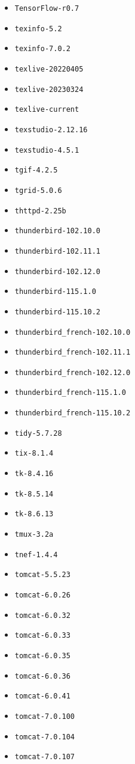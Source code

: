 \begin{multicols}{3}
\begin{itemize}
\item \verb|TensorFlow-r0.7|
\item \verb|texinfo-5.2|
\item \verb|texinfo-7.0.2|
\item \verb|texlive-20220405|
\item \verb|texlive-20230324|
\item \verb|texlive-current|
\item \verb|texstudio-2.12.16|
\item \verb|texstudio-4.5.1|
\item \verb|tgif-4.2.5|
\item \verb|tgrid-5.0.6|
\item \verb|thttpd-2.25b|
\item \verb|thunderbird-102.10.0|
\item \verb|thunderbird-102.11.1|
\item \verb|thunderbird-102.12.0|
\item \verb|thunderbird-115.1.0|
\item \verb|thunderbird-115.10.2|
\item \verb|thunderbird_french-102.10.0|
\item \verb|thunderbird_french-102.11.1|
\item \verb|thunderbird_french-102.12.0|
\item \verb|thunderbird_french-115.1.0|
\item \verb|thunderbird_french-115.10.2|
\item \verb|tidy-5.7.28|
\item \verb|tix-8.1.4|
\item \verb|tk-8.4.16|
\item \verb|tk-8.5.14|
\item \verb|tk-8.6.13|
\item \verb|tmux-3.2a|
\item \verb|tnef-1.4.4|
\item \verb|tomcat-5.5.23|
\item \verb|tomcat-6.0.26|
\item \verb|tomcat-6.0.32|
\item \verb|tomcat-6.0.33|
\item \verb|tomcat-6.0.35|
\item \verb|tomcat-6.0.36|
\item \verb|tomcat-6.0.41|
\item \verb|tomcat-7.0.100|
\item \verb|tomcat-7.0.104|
\item \verb|tomcat-7.0.107|

\end{itemize}
\end{multicols}
